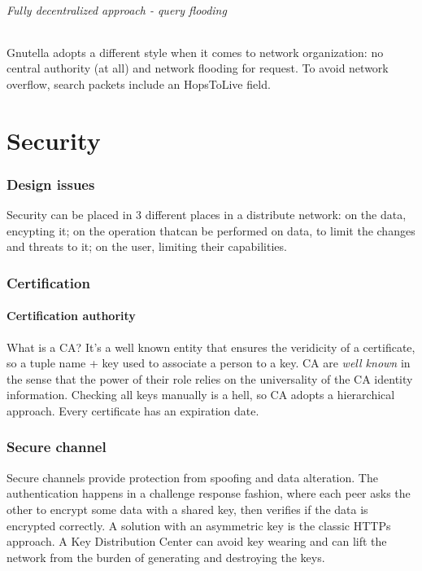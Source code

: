 \documentclass[10pt,a4paper]{article}
\begin{document}
			\paragraph{Fully decentralized approach - query flooding}
				Gnutella adopts a different style when it comes to network organization: no central authority (at all) and network flooding for request. To avoid network overflow, search packets include an HopsToLive field. 
				
	\part{Security}
		\section{Design issues}
			Security can be placed in 3 different places in a distribute network: on the data, encypting it; on the operation thatcan be performed on data, to limit the changes and threats to it; on the user, limiting their capabilities.
		\section{Certification}
			\subsection{Certification authority}
				What is a CA? It's a well known entity that ensures the veridicity of a certificate, so a tuple name + key used to associate a person to a key. CA are \emph{well known} in the sense that the power of their role relies on the universality of the CA identity information. Checking all keys manually is a hell, so CA adopts a hierarchical approach. Every certificate has an expiration date.
		\section{Secure channel}
			Secure channels provide protection from spoofing and data alteration. The authentication happens in a challenge response fashion, where each peer asks the other to encrypt some data with a shared key, then verifies if the data is encrypted correctly. A solution with an asymmetric key is the classic HTTPs approach. A Key Distribution Center can avoid key wearing and can lift the network from the burden of generating and destroying the keys. 
\end{document}
